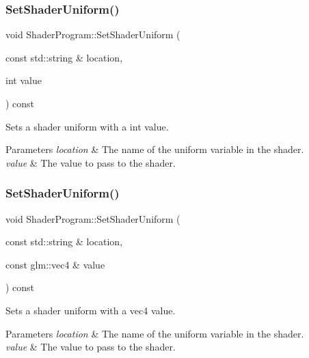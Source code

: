\subsubsection{\texorpdfstring{Set\+Shader\+Uniform()}{SetShaderUniform()}\hspace{0.1cm}{\footnotesize\ttfamily [3/4]}}
{\footnotesize\ttfamily void Shader\+Program\+::\+Set\+Shader\+Uniform (\begin{DoxyParamCaption}\item[{const std\+::string \&}]{location,  }\item[{int}]{value }\end{DoxyParamCaption}) const}



Sets a shader uniform with a int value. 


\begin{DoxyParams}{Parameters}
{\em location} & The name of the uniform variable in the shader. \\
\hline
{\em value} & The value to pass to the shader. \\
\hline
\end{DoxyParams}
\hypertarget{class_shader_program_a5138c3a38a576bbb90d37ab8be6395bf}{}\label{class_shader_program_a5138c3a38a576bbb90d37ab8be6395bf} 
\subsubsection{\texorpdfstring{Set\+Shader\+Uniform()}{SetShaderUniform()}\hspace{0.1cm}{\footnotesize\ttfamily [4/4]}}
{\footnotesize\ttfamily void Shader\+Program\+::\+Set\+Shader\+Uniform (\begin{DoxyParamCaption}\item[{const std\+::string \&}]{location,  }\item[{const glm\+::vec4 \&}]{value }\end{DoxyParamCaption}) const}



Sets a shader uniform with a vec4 value. 


\begin{DoxyParams}{Parameters}
{\em location} & The name of the uniform variable in the shader. \\
\hline
{\em value} & The value to pass to the shader. \\
\hline
\end{DoxyParams}
\hypertarget{class_shader_program_abefd4e66aae75993f05bd607b6b0ed22}{}\label{class_shader_program_abefd4e66aae75993f05bd607b6b0ed22} 
